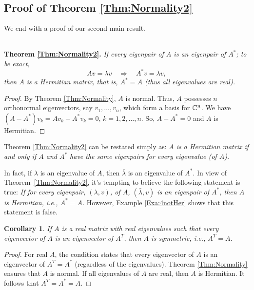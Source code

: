 \documentclass{article}
\newtheorem{corollary}{Corollary}
\begin{document}
\subsection{Proof of Theorem \ref{Thm:Normality2}} We end with a proof of our second main result. \\ \

\noindent \textbf{Theorem \ref{Thm:Normality2}.} \emph{If every eigenpair of $A$ is an eigenpair of $A^*$; to be exact,
\begin{equation*}
Av = \lambda v
 \quad \Rightarrow \quad
A^*v = \lambda v,
\end{equation*}
then $A$ is a Hermitian matrix, that is, $A^*=A$ (thus all eigenvalues are real).}

\begin{proof}  By Theorem \ref{Thm:Normality}, $A$ is normal. Thus, $A$ possesses $n$     orthonormal eigenvectors, say
$v_1, \dots, v_n$,  which  form a basis for $\Bbb C^n$. We have
 $(A-A^*)v_k=Av_k-A^*v_k =0$, $k=1, 2, \dots, n$. So, $A-A^*=0$ and $A$ is Hermitian. \end{proof}


Theorem \ref{Thm:Normality2} can be restated simply as: \emph{$A$ is a Hermitian matrix if and only if $A$ and $A^*$ have the same eigenpairs for every eigenvalue (of $A$).}
\medskip

In fact, if $\lambda$ is an eigenvalue of $A$, then
$\overline{\lambda}$ is an eigenvalue of $A^*$.
In view of  Theorem~\ref{Thm:Normality2}, it's  tempting to believe the following statement is true: \emph{If  for every eigenpair, $(\lambda ,v)$,  of $A$,  $(\bar{\lambda},v)$ is an eigenpair of $A^*$, then $A$ is Hermitian, i.e., $A^*=A$.} However, Example \ref{Exa:4notHer} shows that this statement is false.

\begin{corollary}\label{Cor:1}
If $A$ is a real matrix with real eigenvalues such that  every   eigenvector of $A$ is an eigenvector of $A^T$,
then $A$ is symmetric, i.e., $A^T=A$.
\end{corollary}

\begin{proof}  For real $A$, the condition  states that every eigenvector of $A$ is an eigenvector of $A^T=A^*$ (regardless of the eigenvalues). Theorem \ref{Thm:Normality}   ensures that $A$ is normal. If all eigenvalues of $A$ are real, then $A$ is Hermitian.
It follows that  $A^T=A^*=A$.
\end{proof}
\end{document}

